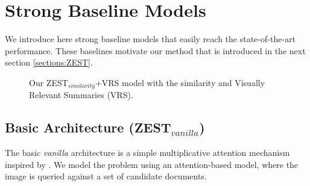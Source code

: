 \documentclass[11pt,a4paper]{article}
\newcommand\yuval[1]{\textcolor{darkpink}{\textbf{YUVAL:} #1 }}
\begin{document}

\section{Strong Baseline Models}
\label{task}

We introduce here strong baseline models that easily reach the state-of-the-art performance. These baselines motivate our method that is introduced in the next section \ref{sections:ZEST}.


\begin{figure}[th]
\centering
{}
 \caption{Our ZEST$_{similarity}$+VRS model with the similarity and Visually Relevant Summaries (VRS).}
\label{fig:model}
\end{figure}
\subsection{Basic Architecture (ZEST$_{vanilla}$)}

The basic {\em vanilla} architecture is a simple multiplicative attention mechanism \cite{luong2015effective} inspired by \citet{romera2015embarrassingly}. We model the problem using an attention-based model, where the image is queried
against a set of candidate documents.



\end{document}
